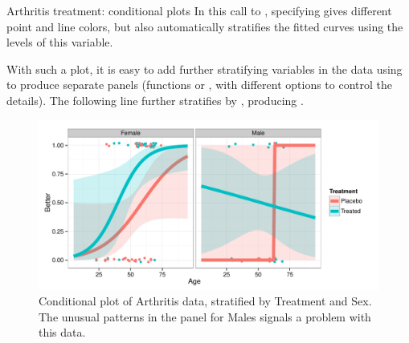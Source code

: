 \documentclass[11pt]{book}
\renewenvironment{knitrout}{\small\renewcommand{\baselinestretch}{.85}}{} %
\begin{document}
\begin{Example}{Arthritis treatment: conditional plots}
\begin{knitrout}
\end{knitrout}
\noindent In this call to ,
specifying  gives different point and line colors, but also
automatically stratifies the fitted curves using the levels of this variable.

With such a plot, it is easy to add further stratifying variables in the data
using  to produce separate panels (functions  or , with
different options to control the details).  The following line further stratifies
by , producing .

\begin{knitrout}
\color{fgcolor}\begin{kframe}
\begin{alltt}
 \hlopt{+} \hlstd{(}\hlopt{~} 
\end{alltt}
\end{kframe}\begin{figure}[!htbp]


\centerline{\includegraphics[width=.8\textwidth,clip]{ch07/fig/arth-cond2} }

\caption[Conditional plot of Arthritis data, stratified by Treatment and Sex]{Conditional plot of Arthritis data, stratified by Treatment and Sex. The unusual patterns in the panel for Males signals a problem with this data.\label{fig:arth-cond2}}
\end{figure}



\end{knitrout}
\end{Example}
\end{document}
